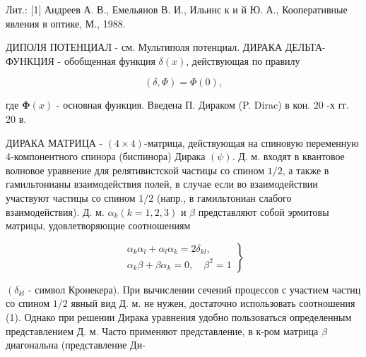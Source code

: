 \documentclass[10pt]{article}
\begin{document}
Лит.: [1] Андреев А. В., Емельянов В. И., Ильинс к и й Ю. А., Кооперативные явления в оптике, М., 1988.



ДИПОЛЯ ПОТЕНЦИАЛ - см. Мультиполя потенциал. ДИРАКА ДЕЛЬТА-ФУНКЦИЯ - обобщенная функция $\delta(x)$, действующая по правилу



\[

(\delta, \Phi)=\Phi(0),

\]



где $\boldsymbol{\Phi}(x)$ - основная функция. Введена П. Дираком (P. Dirac) в кон. 20 -х гг. 20 в.



ДИРАКА МАТРИЦА - $(4 \times 4)$-матрица, действующая на спиновую переменную 4-компонентного спинора (биспинора) Дирака $(\psi)$. Д. м. входят в квантовое волновое уравнение для релятивистской частицы со спином $1 / 2$, а также в гамильтонианы взаимодействия полей, в случае если во взаимодействии участвуют частицы со спином $1 / 2$ (напр., в гамильтониан слабого взаимодействия). Д. м. $\alpha_{k}(k=1,2,3)$ и $\beta$ представляют собой эрмитовы матрицы, удовлетворяющие соотношениям



\[

\left.\begin{array}{l}

\alpha_{k} \alpha_{l}+\alpha_{l} \alpha_{k}=2 \delta_{k l}, \\

\alpha_{k} \beta+\beta \alpha_{k}=0, \quad \beta^{2}=1

\end{array}\right\}

\]



$\left(\delta_{k l}\right.$ - символ Кронекера). При вычислении сечений процессов с участием частиц со спином $1 / 2$ явный вид Д. м. не нужен, достаточно использовать соотношения (1). Однако при решении Дирака уравнения удобно пользоваться определенным представлением Д. м. Часто применяют представление, в к-ром матрица $\beta$ диагональна (представление Ди-
\end{document}
